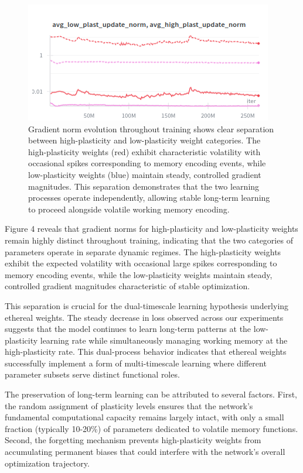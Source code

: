\documentclass{article} %
\begin{document}
\begin{figure}[h]
\begin{center}
\includegraphics[width=0.8\linewidth]{figure_4.png}
\caption{Gradient norm evolution throughout training shows clear separation between high-plasticity and low-plasticity weight categories. The high-plasticity weights (red) exhibit characteristic volatility with occasional spikes corresponding to memory encoding events, while low-plasticity weights (blue) maintain steady, controlled gradient magnitudes. This separation demonstrates that the two learning processes operate independently, allowing stable long-term learning to proceed alongside volatile working memory encoding.}
\label{fig:gradient_norms}
\end{center}
\end{figure}

Figure 4 reveals that gradient norms for high-plasticity and low-plasticity weights remain highly distinct throughout training, indicating that the two categories of parameters operate in separate dynamic regimes. The high-plasticity weights exhibit the expected volatility with occasional large spikes corresponding to memory encoding events, while the low-plasticity weights maintain steady, controlled gradient magnitudes characteristic of stable optimization.

This separation is crucial for the dual-timescale learning hypothesis underlying ethereal weights. The steady decrease in loss observed across our experiments suggests that the model continues to learn long-term patterns at the low-plasticity learning rate while simultaneously managing working memory at the high-plasticity rate. This dual-process behavior indicates that ethereal weights successfully implement a form of multi-timescale learning where different parameter subsets serve distinct functional roles.

The preservation of long-term learning can be attributed to several factors. First, the random assignment of plasticity levels ensures that the network's fundamental computational capacity remains largely intact, with only a small fraction (typically 10-20\%) of parameters dedicated to volatile memory functions. Second, the forgetting mechanism prevents high-plasticity weights from accumulating permanent biases that could interfere with the network's overall optimization trajectory.
\end{document}
